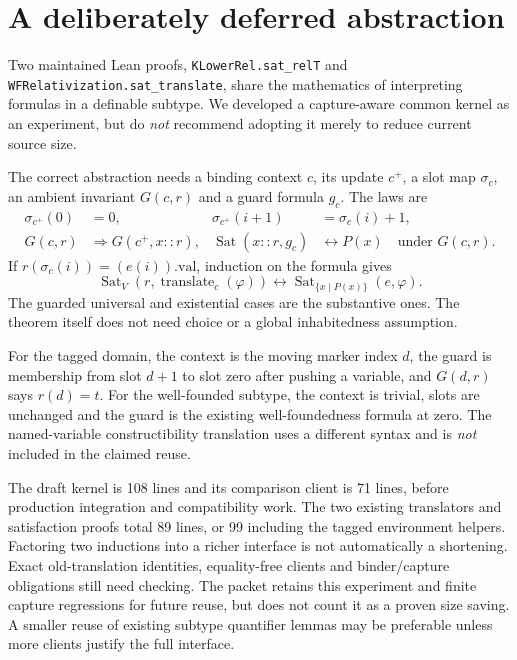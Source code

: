 \documentclass[11pt]{article}
\begin{document}
\section{A deliberately deferred abstraction}
Two maintained Lean proofs, \texttt{KLowerRel.sat\_relT} and \texttt{WFRelativization.sat\_translate}, share the mathematics of interpreting formulas in a definable subtype. We developed a capture-aware common kernel as an experiment, but do \emph{not} recommend adopting it merely to reduce current source size.

The correct abstraction needs a binding context $c$, its update $c^+$, a slot map $\sigma_c$, an ambient invariant $G(c,r)$ and a guard formula $g_c$. The laws are
\begin{align*}
\sigma_{c^+}(0)&=0,&\sigma_{c^+}(i+1)&=\sigma_c(i)+1,\\
G(c,r)&\Rightarrow G(c^+,x::r),&
\operatorname{Sat}(x::r,g_c)&\longleftrightarrow P(x)\quad\text{under }G(c,r).
\end{align*}
If $r(\sigma_c(i))=(e(i)).\mathrm{val}$, induction on the formula gives
\[
\operatorname{Sat}_{V}(r,\operatorname{translate}_c(\varphi))
\longleftrightarrow
\operatorname{Sat}_{\{x\mid P(x)\}}(e,\varphi).
\]
The guarded universal and existential cases are the substantive ones. The theorem itself does not need choice or a global inhabitedness assumption.

For the tagged domain, the context is the moving marker index $d$, the guard is membership from slot $d+1$ to slot zero after pushing a variable, and $G(d,r)$ says $r(d)=t$. For the well-founded subtype, the context is trivial, slots are unchanged and the guard is the existing well-foundedness formula at zero. The named-variable constructibility translation uses a different syntax and is \emph{not} included in the claimed reuse.

The draft kernel is 108 lines and its comparison client is 71 lines, before production integration and compatibility work. The two existing translators and satisfaction proofs total 89 lines, or 99 including the tagged environment helpers. Factoring two inductions into a richer interface is not automatically a shortening. Exact old-translation identities, equality-free clients and binder/capture obligations still need checking. The packet retains this experiment and finite capture regressions for future reuse, but does not count it as a proven size saving. A smaller reuse of existing subtype quantifier lemmas may be preferable unless more clients justify the full interface.
\end{document}
